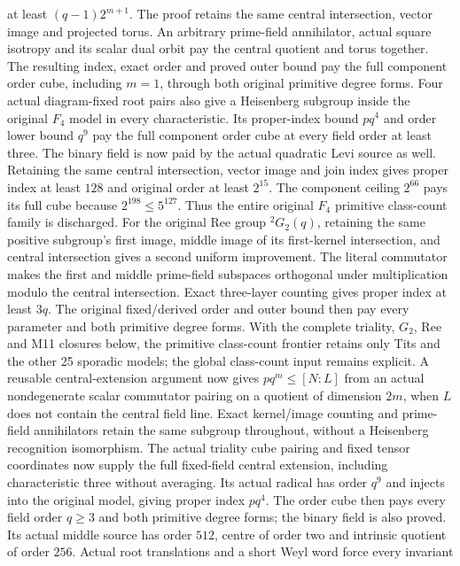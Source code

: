 at least $(q-1)2^{m+1}$. The proof retains the same central intersection,
vector image and projected torus. An arbitrary prime-field annihilator,
actual square isotropy and its scalar dual orbit pay the central quotient
and torus together. The resulting index, exact order and proved outer
bound pay the full component order cube, including $m=1$, through both
original primitive degree forms.
Four actual diagram-fixed root pairs also give a Heisenberg subgroup
inside the original $F_4$ model in every characteristic. Its proper-index
bound $pq^4$ and order lower bound $q^9$ pay the full component order
cube at every field order at least three. The binary field is now
paid by the actual quadratic Levi source as well. Retaining the same
central intersection, vector image and join index gives proper index
at least $128$ and original order at least $2^{15}$. The component ceiling
$2^{66}$ pays its full cube because $2^{198}\leq5^{127}$. Thus the entire
original $F_4$ primitive class-count family is discharged.
For the original Ree group ${}^2G_2(q)$, retaining the same positive
subgroup's first image, middle image of its first-kernel intersection,
and central intersection gives a second uniform improvement. The literal
commutator makes the first and middle prime-field subspaces orthogonal
under multiplication modulo the central intersection. Exact three-layer
counting gives proper index at least $3q$. The original fixed/derived
order and outer bound then pay every parameter and both primitive degree
forms. With the complete triality, $G_2$, Ree and M11 closures below,
the primitive class-count frontier retains only Tits and the other
25 sporadic models; the global class-count input remains explicit.
A reusable central-extension argument now gives $pq^m\leq[N:L]$
from an actual nondegenerate scalar commutator pairing on a quotient of
dimension $2m$, when $L$ does not contain the central field line. Exact
kernel/image counting and prime-field annihilators retain the same
subgroup throughout, without a Heisenberg recognition isomorphism.
The actual triality cube pairing and fixed tensor coordinates now
supply the full fixed-field central extension, including characteristic
three without averaging. Its actual radical has order $q^9$ and injects
into the original model, giving proper index $pq^4$. The order cube
then pays every field order $q\geq3$ and both primitive degree forms;
the binary field is also proved. Its actual middle source has order
$512$, centre of order two and intrinsic quotient of order $256$.
Actual root translations and a short Weyl word force every invariant

